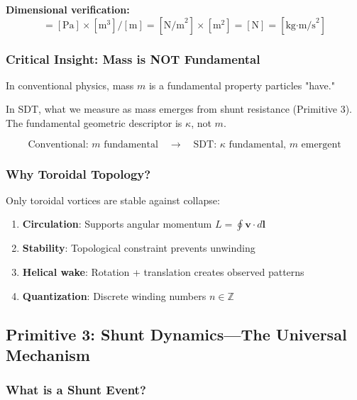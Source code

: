 \textbf{Dimensional verification:}
\begin{equation}
[\kappa] = [\text{Pa}] \times [\text{m}^3] / [\text{m}] = [\text{N/m}^2] \times [\text{m}^2] = [\text{N}] = [\text{kg·m/s}^2]
\end{equation}

\subsubsection{Critical Insight: Mass is NOT Fundamental}

In conventional physics, mass $m$ is a fundamental property particles "have."

In SDT, what we measure as mass emerges from shunt resistance (Primitive 3). The fundamental geometric descriptor is $\kappa$, not $m$.

\begin{equation}
\boxed{\text{Conventional: } m \text{ fundamental} \quad \longrightarrow \quad \text{SDT: } \kappa \text{ fundamental, } m \text{ emergent}}
\end{equation}

\subsubsection{Why Toroidal Topology?}

Only toroidal vortices are stable against collapse:

\begin{enumerate}
\item \textbf{Circulation}: Supports angular momentum $L = \oint \mathbf{v} \cdot d\mathbf{l}$
\item \textbf{Stability}: Topological constraint prevents unwinding
\item \textbf{Helical wake}: Rotation + translation creates observed patterns
\item \textbf{Quantization}: Discrete winding numbers $n \in \mathbb{Z}$
\end{enumerate}

\subsection{Primitive 3: Shunt Dynamics—The Universal Mechanism}

\subsubsection{What is a Shunt Event?}

